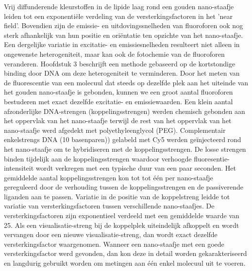 Vrij diffunderende kleurstoffen in de lipide laag rond een gouden nano-staafje leiden tot een exponentiële verdeling van de versterkingsfactoren in het ’near field’. Bovendien zijn de emissie- en uitdovingssnelheden van fluoroforen ook nog sterk afhankelijk van hun positie en oriëntatie ten opzichte van het nano-staafje. Een dergelijke variatie in excitatie- en emissiesnelheden resulteert niet alleen in ongewenste heterogeniteit, maar kan ook de fotochemie van de fluoroforen veranderen. Hoofdstuk 3 beschrijft  een methode gebaseerd op de kortstondige binding door DNA om deze heterogeniteit te verminderen. Door het meten van de fluorescentie van een molecuul dat steeds op dezelfde plek aan het uiteinde van het gouden nano-staafje is gebonden, kunnen we een groot aantal fluoroforen bestuderen met exact dezelfde excitatie- en emissiewaarden. Een klein aantal afzonderlijke DNA-strengen (koppelingsstrengen) werden chemisch gebonden aan het oppervlak van het nano-staafje terwijl de rest van het oppervlak van het nano-staafje werd afgedekt met polyethyleenglycol (PEG). Complementair enkelstrengs DNA (10 basenparen)) gelabeld met Cy5 werden geïnjecteerd rond het nano-staafje om te hybridiseren met de koppelingsstrengen. De losse strengen binden tijdelijk aan de koppelingsstrengen waardoor verhoogde fluoresentie-intensiteit wordt verkregen met een typische duur van een paar seconden. Het gemiddelde aantal koppelingsstrengen kon tot tot één per nano-staafje gereguleerd door de verhouding tussen de koppelingsstrengen en de passiverende liganden aan te passen. Variatie in de positie van de koppelstreng leidde tot variatie van versterkingsfactoren tussen verschillende nano-staafjes. De versterkingsfactoren zijn exponentieel verdeeld met een gemiddelde waarde van 25. Als een visualisatie-streng bij de koppelplek uiteindelijk afkoppelt en wordt vervangen door een nieuwe visualisatie-streng, dan wordt exact dezelfde versterkingsfactor waargenomen. Wanneer een nano-staafje met een goede versterkingsfactor werd gevonden, dan kon deze in detail worden gekarakteriseerd en langdurig gebruikt worden om metingen aan één enkel molecuul uit te voeren.


